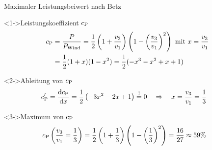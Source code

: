 \begin{frame}{Maximaler Leistungsbeiwert nach Betz } 
\setlength{\abovedisplayskip}{0pt}
\setlength{\belowdisplayskip}{1pt}
	\begin{block}<1->{Leistungskoeffizient $c_{\textnormal{P}}$}
		\begin{align*}
			c_{\textnormal{P}} & = \frac{P}{P_{\textnormal{Wind}}} = \frac{1}{2} \left( 1 + \frac{v_3}{v_1} \right) \left( 1 - \left( \frac{v_3}{v_1} \right)^2 \right) \text{\ mit\ } x=\frac{v_3}{v_1}\\
			& = \frac{1}{2} (1+x)(1-x^2)=\frac{1}{2}(-x^3-x^2+x+1)
		\end{align*}
	\end{block}	
	\vspace*{-1pt}
	\begin{block}<2->{Ableitung von $c_{\textnormal{P}}$}
		\begin{align*}
		c_{\textnormal{P}}' &= \frac{\textnormal{d} c_{\textnormal{P}}}{\textnormal{d}x} = \frac{1}{2} \left( - 3 x^2 - 2 x +1 \right)\overset{!}{=}  0 \quad \Rightarrow \quad x=\frac{v_3}{v_1} = \frac{1}{3}
		\end{align*}
	\end{block}
	\vspace*{-1pt}
	\begin{block}<3->{Maximum von $c_{\textnormal{P}}$}
		\begin{align*}
		c_{\textnormal{P}} \left( \frac{v_3}{v_1} = \frac{1}{3} \right) &= \frac{1}{2} \left( 1 + \frac{1}{3} \right) \left( 1 - \left( \frac{1}{3} \right)^2 \right) = \frac{16}{27} \approx 59\%
		\end{align*}
	\end{block}
\end{frame}
